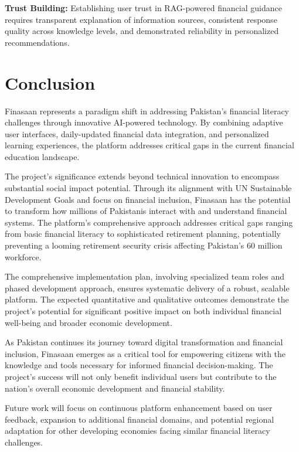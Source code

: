\documentclass[12pt]{article}
\begin{document}
\textbf{Trust Building:} Establishing user trust in RAG-powered financial guidance requires transparent explanation of information sources, consistent response quality across knowledge levels, and demonstrated reliability in personalized recommendations.

\section{Conclusion}
Finasaan represents a paradigm shift in addressing Pakistan's financial literacy challenges through innovative AI-powered technology. By combining adaptive user interfaces, daily-updated financial data integration, and personalized learning experiences, the platform addresses critical gaps in the current financial education landscape.

The project's significance extends beyond technical innovation to encompass substantial social impact potential. Through its alignment with UN Sustainable Development Goals and focus on financial inclusion, Finasaan has the potential to transform how millions of Pakistanis interact with and understand financial systems. The platform's comprehensive approach addresses critical gaps ranging from basic financial literacy to sophisticated retirement planning, potentially preventing a looming retirement security crisis affecting Pakistan's 60 million workforce.

The comprehensive implementation plan, involving specialized team roles and phased development approach, ensures systematic delivery of a robust, scalable platform. The expected quantitative and qualitative outcomes demonstrate the project's potential for significant positive impact on both individual financial well-being and broader economic development.

As Pakistan continues its journey toward digital transformation and financial inclusion, Finasaan emerges as a critical tool for empowering citizens with the knowledge and tools necessary for informed financial decision-making. The project's success will not only benefit individual users but contribute to the nation's overall economic development and financial stability.

Future work will focus on continuous platform enhancement based on user feedback, expansion to additional financial domains, and potential regional adaptation for other developing economies facing similar financial literacy challenges.
\end{document}
